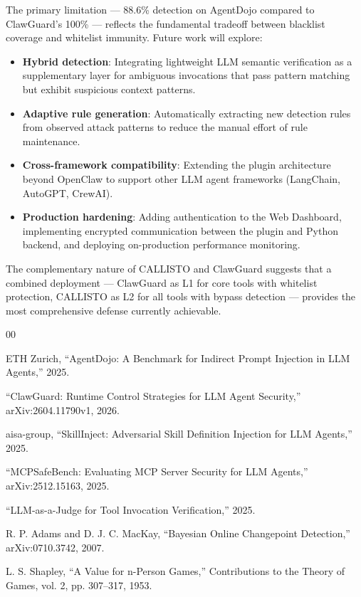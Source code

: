 \documentclass[10pt,conference]{IEEEtran}
\begin{document}
The primary limitation — 88.6\% detection on AgentDojo compared to ClawGuard's 100\% — reflects the fundamental tradeoff between blacklist coverage and whitelist immunity. Future work will explore:

\begin{itemize}
    \item \textbf{Hybrid detection}: Integrating lightweight LLM semantic verification as a supplementary layer for ambiguous invocations that pass pattern matching but exhibit suspicious context patterns.
    \item \textbf{Adaptive rule generation}: Automatically extracting new detection rules from observed attack patterns to reduce the manual effort of rule maintenance.
    \item \textbf{Cross-framework compatibility}: Extending the plugin architecture beyond OpenClaw to support other LLM agent frameworks (LangChain, AutoGPT, CrewAI).
    \item \textbf{Production hardening}: Adding authentication to the Web Dashboard, implementing encrypted communication between the plugin and Python backend, and deploying on-production performance monitoring.
\end{itemize}

The complementary nature of CALLISTO and ClawGuard suggests that a combined deployment — ClawGuard as L1 for core tools with whitelist protection, CALLISTO as L2 for all tools with bypass detection — provides the most comprehensive defense currently achievable.

\begin{thebibliography}{00}

ETH Zurich, ``AgentDojo: A Benchmark for Indirect Prompt Injection in LLM Agents,'' 2025.

``ClawGuard: Runtime Control Strategies for LLM Agent Security,'' arXiv:2604.11790v1, 2026.

aisa-group, ``SkillInject: Adversarial Skill Definition Injection for LLM Agents,'' 2025.

``MCPSafeBench: Evaluating MCP Server Security for LLM Agents,'' arXiv:2512.15163, 2025.

``LLM-as-a-Judge for Tool Invocation Verification,'' 2025.

R. P. Adams and D. J. C. MacKay, ``Bayesian Online Changepoint Detection,'' arXiv:0710.3742, 2007.

L. S. Shapley, ``A Value for n-Person Games,'' Contributions to the Theory of Games, vol. 2, pp. 307–317, 1953.

\end{thebibliography}
\end{document}
